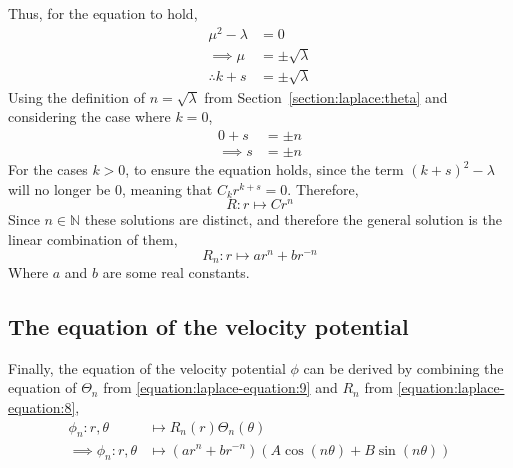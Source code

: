 Thus, for the equation to hold,
\begin{align*}
    \mu^2-\lambda&=0\\
    \implies\mu&=\pm\sqrt{\lambda}\\
    \therefore k+s&=\pm\sqrt{\lambda}
\end{align*}
Using the definition of $n=\sqrt{\lambda}$ from Section~\ref{section:laplace:theta} and considering the case where $k=0$,
\begin{align*}
    0+s&=\pm n\\
    \implies s&=\pm n
\end{align*}
For the cases $k>0$, to ensure the equation holds, since the term $(k+s)^2-\lambda$ will no longer be $0$, meaning that $C_k r^{k+s}=0$. Therefore,
$$
    R:r\mapsto Cr^{n}
$$
Since $n\in\mathbb{N}$ these solutions are distinct, and therefore the general solution is the linear combination of them,
\begin{equation}\label{equation:laplace-equation:8}
    R_n:r\mapsto ar^n+br^{-n}
\end{equation}
Where $a$ and $b$ are some real constants.

\subsection{The equation of the velocity potential}
Finally, the equation of the velocity potential $\phi$ can be derived by combining the equation of $\Theta_n$ from \eqref{equation:laplace-equation:9}
and $R_n$ from \eqref{equation:laplace-equation:8},
\begin{align*}
    \phi_n:r,\theta&\mapsto R_n(r)\Theta_n(\theta)\\
    \implies\phi_n:r,\theta&\mapsto\left(ar^n+br^{-n}\right)\left(A\cos\left(n\theta\right)+B\sin\left(n\theta\right)\right)
\end{align*}